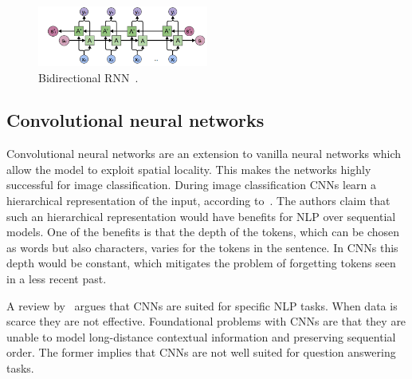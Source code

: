 \begin{figure}[htbp]
    \begin{center}
        \includegraphics[width=0.5\textwidth]{figures/bidirectional.png}
    \end{center}
    \caption{Bidirectional RNN~\citep{olah2015}.}
    \label{fig:bidirectional}
\end{figure}

\subsection{Convolutional neural networks}
\label{subsec:cnn}
Convolutional neural networks are an extension to vanilla neural networks which allow the model to exploit spatial locality.
This makes the networks highly successful for image classification.
During image classification CNNs learn a hierarchical representation of the input, according to~\citet{conneau2016very}.
The authors claim that such an hierarchical representation would have benefits for NLP over sequential models.
One of the benefits is that the depth of the tokens, which can be chosen as words but also characters, varies for the tokens in the sentence.
In CNNs this depth would be constant, which mitigates the problem of forgetting tokens seen in a less recent past.

A review by~\citet{young2018recent} argues that CNNs are suited for specific NLP tasks.
When data is scarce they are not effective.
Foundational problems with CNNs are that they are unable to model long-distance contextual information and preserving sequential order.
The former implies that CNNs are not well suited for question answering tasks.

